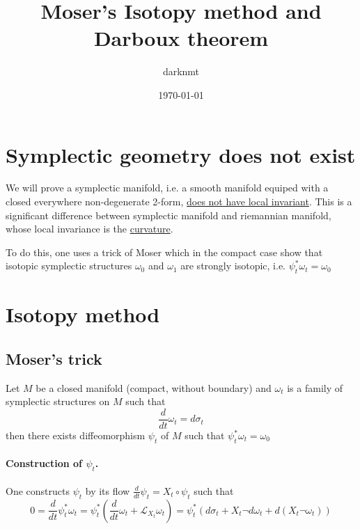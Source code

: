 \documentclass[11pt]{article}
\author{darknmt}
\date{\today}
\title{Moser's Isotopy method and Darboux theorem}
\begin{document}
\maketitle
\tableofcontents

\iffalse
\begin{info}
The PDF version of this page can be downloaded by replacing \texttt{html} in the its address by
\texttt{pdf}. 
For example \texttt{/html/sheaf-cohomology.html} should become \texttt{/pdf/sheaf-cohomology.pdf}.
\end{info}
\fi

\iffalse
\begin{info}
This post is a part of the \href{../res/Stage2017.pdf}{memoire of my M1 internship} at I2M. The memoire contains,
needless to say, less errors than this page.
\end{info}
\fi

\section{Symplectic geometry does not exist}
\label{sec:org3316df4}
We will prove a symplectic manifold, i.e. a smooth manifold equiped with a closed
everywhere non-degenerate 2-form, \uline{does not have local invariant}. This is a significant
difference between symplectic manifold and riemannian manifold, whose local invariance is
the \uline{curvature}.

To do this, one uses a trick of Moser which in the compact case show that isotopic
symplectic structures \(\omega_0\) and \(\omega_1\) are strongly isotopic, i.e. \(\psi_t^* \omega_t = \omega_0\)
\section{Isotopy method}
\label{sec:orgeb2e2ed}
\subsection{Moser's trick}
\label{sec:org5832dcd}
Let \(M\) be a closed manifold (compact, without boundary) and \(\omega_t\) is a family of
symplectic structures on \(M\) such that
\[
\frac{d}{dt}\omega_t = d\sigma_t
\]
then there exists diffeomorphism \(\psi_t\) of \(M\) such that \(\psi_t^* \omega_t = \omega_0\)


\paragraph{Construction of \(\psi_t\).}
\label{sec:org551d75e}
One constructs \(\psi_t\) by its flow \(\frac{d}{dt}\psi_t = X_t \circ \psi_t\) such that
\[
0 = \frac{d}{dt}\psi_t^*\omega_t = \psi_t^* \left(\frac{d}{dt} \omega_t +
\mathcal{L}_{X_t}\omega_t\right) = \psi_t^* \left( d\sigma_t + X_t \neg d\omega_t + d(X_t
\neg \omega_t) \right)
\]
\end{document}
